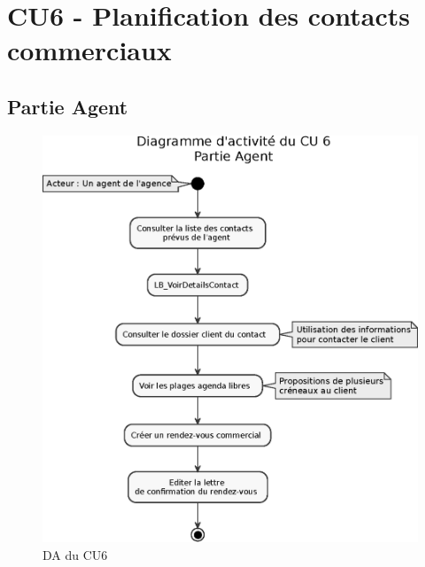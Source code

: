 \section{CU6 - Planification des contacts commerciaux}

\subsection{Partie Agent}
\begin{figure}[H]
\centering
\includegraphics[width=\textwidth]{figures/eps/DA_CU6_partieAgent.eps}
\caption{DA du CU6}
\end{figure}

